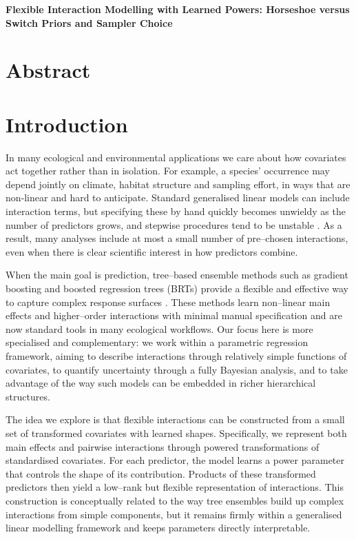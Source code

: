 \documentclass[11pt]{article}
\begin{document}
\renewcommand{\thesection}{\arabic{section}}
\begin{doublespacing}
\begin{linenumbers}
\begin{flushleft}
{\bf \large Flexible Interaction Modelling with Learned Powers: Horseshoe versus Switch Priors and Sampler Choice}\\ 

\newpage

\section*{Abstract}



\section{Introduction}

In many ecological and environmental applications we care about how covariates act together rather than in isolation. For example, a species' occurrence may depend jointly on climate, habitat structure and sampling effort, in ways that are non‐linear and hard to anticipate. Standard generalised linear models can include interaction terms, but specifying these by hand quickly becomes unwieldy as the number of predictors grows, and stepwise procedures tend to be unstable \citep{2015_warton,2009_zurr,2017_zuur}. As a result, many analyses include at most a small number of pre–chosen interactions, even when there is clear scientific interest in how predictors combine.

When the main goal is prediction, tree–based ensemble methods such as gradient boosting and boosted regression trees (BRTs) provide a flexible and effective way to capture complex response surfaces \citep{2001_friedman,2008_elith}. These methods learn non–linear main effects and higher–order interactions with minimal manual specification and are now standard tools in many ecological workflows. Our focus here is more specialised and complementary: we work within a parametric regression framework, aiming to describe interactions through relatively simple functions of covariates, to quantify uncertainty through a fully Bayesian analysis, and to take advantage of the way such models can be embedded in richer hierarchical structures.

The idea we explore is that flexible interactions can be constructed from a small set of transformed covariates with learned shapes. Specifically, we represent both main effects and pairwise interactions through powered transformations of standardised covariates. For each predictor, the model learns a power parameter that controls the shape of its contribution. Products of these transformed predictors then yield a low–rank but flexible representation of interactions. This construction is conceptually related to the way tree ensembles build up complex interactions from simple components, but it remains firmly within a generalised linear modelling framework and keeps parameters directly interpretable.


\end{flushleft}
\end{linenumbers}
\end{doublespacing}
\end{document}
